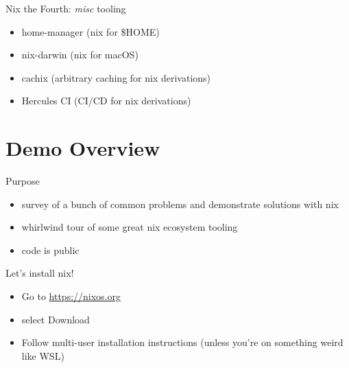 \documentclass[bigger]{beamer}
\begin{document}
\begin{frame}[label={sec:org1a2a2e4}]{Nix the Fourth: \emph{misc} tooling}
\begin{itemize}
\item home-manager (nix for \$HOME)
\item nix-darwin (nix for macOS)
\item cachix (arbitrary caching for nix derivations)
\item Hercules CI (CI/CD for nix derivations)
\end{itemize}
\end{frame}
\section{Demo Overview}
\label{sec:org3c81b7a}
\begin{frame}[label={sec:org6f9fc42}]{Purpose}
\begin{itemize}
\item survey of a bunch of common problems and demonstrate solutions with nix
\item whirlwind tour of some great nix ecosystem tooling
\item code is public
\end{itemize}
\end{frame}
\begin{frame}[label={sec:org6a09cd0}]{Let's install nix!}
\begin{itemize}
\item Go to \url{https://nixos.org}
\item select \alert{Download}
\item Follow multi-user installation instructions (unless you're on something weird like WSL)
\end{itemize}
\end{frame}
\end{document}
